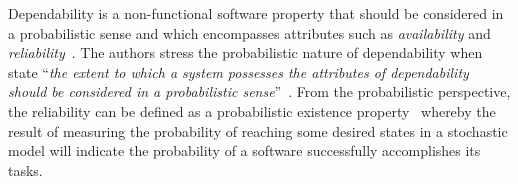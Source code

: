 Dependability is a non-functional software property that should be considered in
a probabilistic sense and which encompasses attributes such as {\em
availability} and {\em reliability}~\cite{avizienis_basic_2004}. The authors
stress the probabilistic nature of dependability when state ``\textit{the
extent to which a system possesses the attributes of dependability should be
considered in a probabilistic sense}''~\cite{avizienis_basic_2004}.  From the
probabilistic perspective, the reliability can be defined as a probabilistic
existence property~\cite{grunske_specification_2008} whereby the result of
measuring the probability of reaching some desired states in a stochastic model
will indicate the probability of a software successfully accomplishes its tasks.




